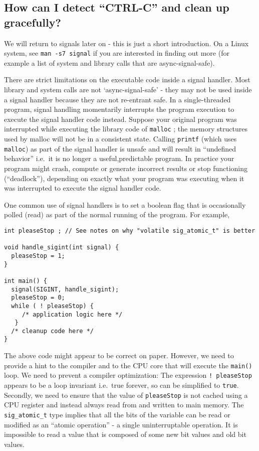 \subsection{\texorpdfstring{How can I detect ``CTRL-C'' and clean up
gracefully?}{How can I detect CTRL-C and clean up gracefully?}}\label{how-can-i-detect-ctrl-c-and-clean-up-gracefully}

We will return to signals later on - this is just a short introduction.
On a Linux system, see \texttt{man\ -s7\ signal} if you are interested
in finding out more (for example a list of system and library calls that
are async-signal-safe).

There are strict limitations on the executable code inside a signal
handler. Most library and system calls are not `async-signal-safe' -
they may not be used inside a signal handler because they are not
re-entrant safe. In a single-threaded program, signal handling
momentarily interrupts the program execution to execute the signal
handler code instead. Suppose your original program was interrupted
while executing the library code of \texttt{malloc} ; the memory
structures used by malloc will not be in a consistent state. Calling
\texttt{printf} (which uses \texttt{malloc}) as part of the signal
handler is unsafe and will result in ``undefined behavior'' i.e.~it is
no longer a useful,predictable program. In practice your program might
crash, compute or generate incorrect results or stop functioning
(``deadlock''), depending on exactly what your program was executing
when it was interrupted to execute the signal handler code.

One common use of signal handlers is to set a boolean flag that is
occasionally polled (read) as part of the normal running of the program.
For example,

\begin{verbatim}
int pleaseStop ; // See notes on why "volatile sig_atomic_t" is better

void handle_sigint(int signal) {
  pleaseStop = 1;
}

int main() {
  signal(SIGINT, handle_sigint);
  pleaseStop = 0;
  while ( ! pleaseStop) { 
     /* application logic here */ 
   }
  /* cleanup code here */
}
\end{verbatim}

The above code might appear to be correct on paper. However, we need to
provide a hint to the compiler and to the CPU core that will execute the
\texttt{main()} loop. We need to prevent a compiler optimization: The
expression \texttt{!\ pleaseStop} appears to be a loop invariant
i.e.~true forever, so can be simplified to \texttt{true}. Secondly, we
need to ensure that the value of \texttt{pleaseStop} is not cached using
a CPU register and instead always read from and written to main memory.
The \texttt{sig\_atomic\_t} type implies that all the bits of the
variable can be read or modified as an ``atomic operation'' - a single
uninterruptable operation. It is impossible to read a value that is
composed of some new bit values and old bit values.

